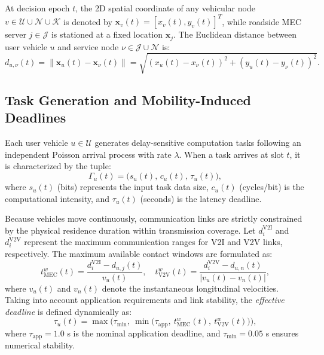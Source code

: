\documentclass[12pt,a4paper]{article}
\begin{document}
At decision epoch $t$, the 2D spatial coordinate of any vehicular node $v \in \mathcal{U} \cup \mathcal{N} \cup \mathcal{K}$ is denoted by $\mathbf{x}_v(t) = [x_v(t), y_v(t)]^T$, while roadside MEC server $j \in \mathcal{J}$ is stationed at a fixed location $\mathbf{x}_j$. The Euclidean distance between user vehicle $u$ and service node $\nu \in \mathcal{J} \cup \mathcal{N}$ is:
\begin{equation}
d_{u,\nu}(t) = \|\mathbf{x}_u(t) - \mathbf{x}_\nu(t)\| = \sqrt{(x_u(t) - x_\nu(t))^2 + (y_u(t) - y_\nu(t))^2}.
\label{eq:euclidean_distance}
\end{equation}

\subsection{Task Generation and Mobility-Induced Deadlines}
Each user vehicle $u \in \mathcal{U}$ generates delay-sensitive computation tasks following an independent Poisson arrival process with rate $\lambda$. When a task arrives at slot $t$, it is characterized by the tuple:
\begin{equation}
\Gamma_u(t) = \big(s_u(t),\, c_u(t),\, \tau_u(t)\big),
\label{eq:task_tuple}
\end{equation}
where $s_u(t)$ (bits) represents the input task data size, $c_u(t)$ (cycles/bit) is the computational intensity, and $\tau_u(t)$ (seconds) is the latency deadline.

Because vehicles move continuously, communication links are strictly constrained by the physical residence duration within transmission coverage. Let $d_i^{\mathrm{V2I}}$ and $d_i^{\mathrm{V2V}}$ represent the maximum communication ranges for V2I and V2V links, respectively. The maximum available contact windows are formulated as:
\begin{equation}
t_{\mathrm{MEC}}^w(t) = \frac{d_i^{\mathrm{V2I}} - d_{u,j}(t)}{v_u(t)}, \quad
t_{\mathrm{V2V}}^w(t) = \frac{d_i^{\mathrm{V2V}} - d_{u,n}(t)}{|v_u(t) - v_n(t)|},
\label{eq:contact_windows}
\end{equation}
where $v_u(t)$ and $v_n(t)$ denote the instantaneous longitudinal velocities. Taking into account application requirements and link stability, the \emph{effective deadline} is defined dynamically as:
\begin{equation}
\tau_u(t) = \max\Big(\tau_{\min},\ \min\big(\tau_{\mathrm{app}},\ t_{\mathrm{MEC}}^w(t),\ t_{\mathrm{V2V}}^w(t)\big)\Big),
\label{eq:effective_deadline}
\end{equation}
where $\tau_{\mathrm{app}} = 1.0$ s is the nominal application deadline, and $\tau_{\min} = 0.05$ s ensures numerical stability.
\end{document}
